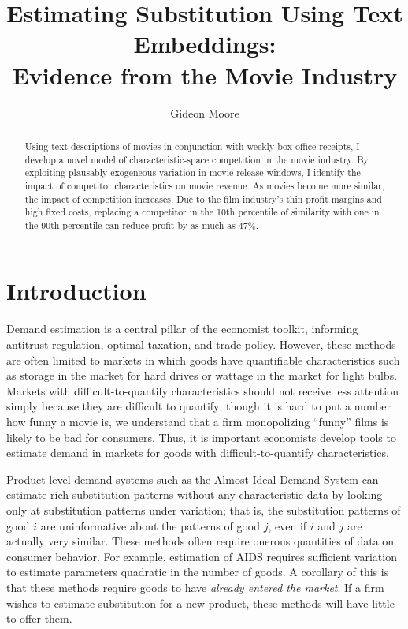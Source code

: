 \documentclass{article}
\author{Gideon Moore}
\title{Estimating Substitution Using Text Embeddings: \\ Evidence from the Movie Industry}
\begin{document}
\maketitle 

\begin{abstract}
    Using text descriptions of movies in conjunction with weekly box office receipts, I develop a novel model of characteristic-space competition in the movie industry. By exploiting plausably exogeneous variation in movie release windows, I identify the impact of competitor characteristics on movie revenue. As movies become more similar, the impact of competition increases. Due to the film industry's thin profit margins and high fixed costs, replacing a competitor in the 10th percentile of similarity with one in the 90th percentile can reduce profit by as much as 47\%. 
\end{abstract}

\section{Introduction}

Demand estimation is a central pillar of the economist toolkit, informing antitrust regulation, optimal taxation, and trade policy. However, these methods are often limited to markets in which goods have quantifiable characteristics such as storage in the market for hard drives or wattage in the market for light bulbs. Markets with difficult-to-quantify characteristics should not receive less attention simply because they are difficult to quantify; though it is hard to put a number how funny a movie is, we understand that a firm monopolizing ``funny'' films is likely to be bad for consumers. Thus, it is important economists develop tools to estimate demand in markets for goods with difficult-to-quantify characteristics.

Product-level demand systems such as the Almost Ideal Demand System \parencite{deaton1980AER} can estimate rich substitution patterns without any characteristic data by looking only at substitution patterns under variation; that is, the substitution patterns of good $i$ are uninformative about the patterns of good $j$, even if $i$ and $j$ are actually very similar. These methods often require onerous quantities of data on consumer behavior. For example, estimation of AIDS requires sufficient variation to estimate parameters quadratic in the number of goods. A corollary of this is that these methods require goods to have \emph{already entered the market}. If a firm wishes to estimate substitution for a new product, these methods will have little to offer them.
\end{document}
